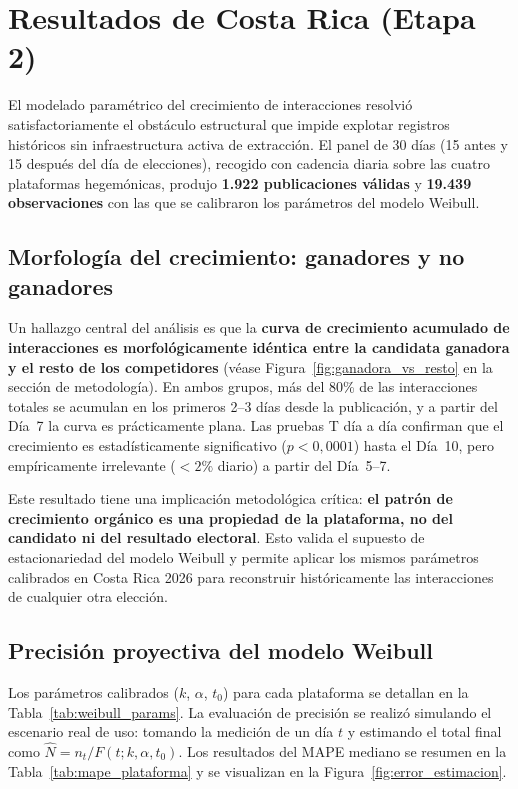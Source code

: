 \section{Resultados de Costa Rica (Etapa 2)}

El modelado paramétrico del crecimiento de interacciones resolvió satisfactoriamente el obstáculo estructural que impide explotar registros históricos sin infraestructura activa de extracción. El panel de 30 días (15 antes y 15 después del día de elecciones), recogido con cadencia diaria sobre las cuatro plataformas hegemónicas, produjo \textbf{1.922 publicaciones válidas} y \textbf{19.439 observaciones} con las que se calibraron los parámetros del modelo Weibull.

\subsection*{Morfología del crecimiento: ganadores y no ganadores}

Un hallazgo central del análisis es que la \textbf{curva de crecimiento acumulado de interacciones es morfológicamente idéntica entre la candidata ganadora y el resto de los competidores} (véase Figura~\ref{fig:ganadora_vs_resto} en la sección de metodología). En ambos grupos, más del 80\% de las interacciones totales se acumulan en los primeros 2--3 días desde la publicación, y a partir del Día~7 la curva es prácticamente plana. Las pruebas T día a día confirman que el crecimiento es estadísticamente significativo ($p < 0{,}0001$) hasta el Día~10, pero empíricamente irrelevante ($< 2\%$ diario) a partir del Día~5--7.

Este resultado tiene una implicación metodológica crítica: \textbf{el patrón de crecimiento orgánico es una propiedad de la plataforma, no del candidato ni del resultado electoral}. Esto valida el supuesto de estacionariedad del modelo Weibull y permite aplicar los mismos parámetros calibrados en Costa Rica 2026 para reconstruir históricamente las interacciones de cualquier otra elección.

\subsection*{Precisión proyectiva del modelo Weibull}

Los parámetros calibrados ($k$, $\alpha$, $t_0$) para cada plataforma se detallan en la Tabla~\ref{tab:weibull_params}. La evaluación de precisión se realizó simulando el escenario real de uso: tomando la medición de un día $t$ y estimando el total final como $\hat{N} = n_t / F(t; k, \alpha, t_0)$. Los resultados del MAPE mediano se resumen en la Tabla~\ref{tab:mape_plataforma} y se visualizan en la Figura~\ref{fig:error_estimacion}.

